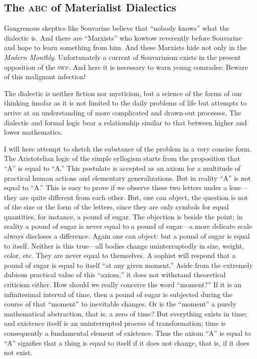 \subsection*{The \textsc{abc} of Materialist Dialectics}

Gangrenous skeptics like Souvarine believe that “nobody knows” what the dialectic is. And there are “Marxists” who kowtow reverently before Souvarine and hope to learn something from him. And these Marxists hide not only in the \emph{Modern Monthly}. Unfortunately a current of Souvarinism exists in the present opposition of the \textsc{swp}. And here it is necessary to warn young comrades: Beware of this malignant infection!
\nowidow

The dialectic is neither fiction nor mysticism, but a science of the forms of our thinking insofar as it is not limited to the daily problems of life but attempts to arrive at an understanding of more complicated and drawn-out processes. The dialectic and formal logic bear a relationship similar to that between higher and lower mathematics.

I will here attempt to sketch the substance of the problem in a very concise form. The Aristotelian logic of the simple syllogism starts from the proposition that “A” is equal to “A.” This postulate is accepted as an axiom for a multitude of practical human actions and elementary generalizations. But in reality “A” is not equal to “A.” This is easy to prove if we observe these two letters under a lens---they are quite different from each other. But, one can object, the question is not of the size or the form of the letters, since they are only symbols for equal quantities, for instance, a pound of sugar. The objection is beside the point; in reality a pound of sugar is never equal to a pound of sugar---a more delicate scale always discloses a difference. Again one can object: but a pound of sugar is equal to itself. Neither is this true---all bodies change uninterruptedly in size, weight, color, etc. They are never equal to themselves. A sophist will respond that a pound of sugar is equal to itself “at any given moment.” Aside from the extremely dubious practical value of this “axiom,” it does not withstand theoretical criticism either. How should we really conceive the word ``moment?'' If it is an infinitesimal interval of time, then a pound of sugar is subjected during the course of that “moment” to inevitable changes. Or is the “moment” a purely mathematical abstraction, that is, a zero of time? But everything exists in time; and existence itself is an uninterrupted process of transformation; time is consequently a fundamental element of existence. Thus the axiom “A” is equal to “A” signifies that a thing is equal to itself if it does not change, that is, if it does not exist.

